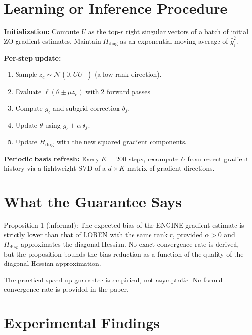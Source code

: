 \documentclass[10pt,twocolumn]{article}
\begin{document}
\section{Learning or Inference Procedure}

\textbf{Initialization:} Compute $U$ as the top-$r$ right singular
vectors of a batch of initial ZO gradient estimates. Maintain
$H_\text{diag}$ as an exponential moving average of $\hat{g}_c^2$.

\textbf{Per-step update:}
\begin{enumerate}[itemsep=2pt,parsep=0pt]
  \item Sample $z_c \sim \mathcal{N}(0, UU^\top)$ (a low-rank direction).
  \item Evaluate $\ell(\theta \pm \mu z_c)$ with 2 forward passes.
  \item Compute $\hat{g}_c$ and subgrid correction $\delta_f$.
  \item Update $\theta$ using $\hat{g}_c + \alpha\,\delta_f$.
  \item Update $H_\text{diag}$ with the new squared gradient components.
\end{enumerate}

\textbf{Periodic basis refresh:} Every $K = 200$ steps, recompute $U$
from recent gradient history via a lightweight SVD of a $d \times K$
matrix of gradient directions.

\section{What the Guarantee Says}

Proposition 1 (informal): The expected bias of the ENGINE gradient
estimate is strictly lower than that of LOREN with the same rank $r$,
provided $\alpha > 0$ and $H_\text{diag}$ approximates the diagonal
Hessian. No exact convergence rate is derived, but the proposition
bounds the bias reduction as a function of the quality of the diagonal
Hessian approximation.

The practical speed-up guarantee is empirical, not asymptotic. No
formal convergence rate is provided in the paper.

\section{Experimental Findings}
\end{document}
